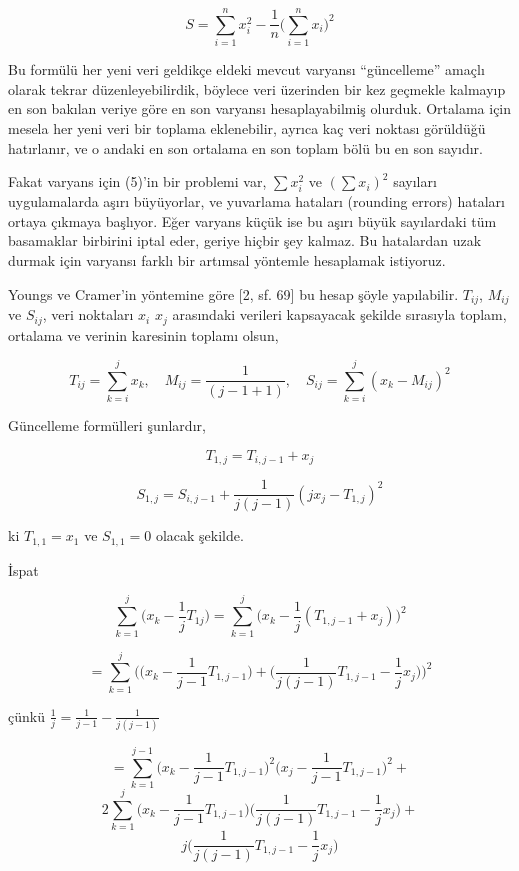 \documentclass[12pt,fleqn]{article}\usepackage{../../common}
\begin{document}
$$ 
S = \sum _{i=1}^{n} x_i^2 - \frac{1}{n} \bigg( \sum _{i=1}^{n} x_i \bigg)^2  
$$

Bu formülü her yeni veri geldikçe eldeki mevcut varyansı ``güncelleme''
amaçlı olarak tekrar düzenleyebilirdik, böylece veri üzerinden bir kez
geçmekle kalmayıp en son bakılan veriye göre en son varyansı
hesaplayabilmiş olurduk. Ortalama için mesela her yeni veri bir toplama
eklenebilir, ayrıca kaç veri noktası görüldüğü hatırlanır, ve o andaki en
son ortalama en son toplam bölü bu en son sayıdır. 

Fakat varyans için (5)'in bir problemi var, $\sum x_i^2$ ve $(\sum x_i)^2$
sayıları uygulamalarda aşırı büyüyorlar, ve yuvarlama hataları (rounding
errors) hataları ortaya çıkmaya başlıyor. Eğer varyans küçük ise bu aşırı
büyük sayılardaki tüm basamaklar birbirini iptal eder, geriye hiçbir şey
kalmaz. Bu hatalardan uzak durmak için varyansı farklı bir artımsal
yöntemle hesaplamak istiyoruz.

Youngs ve Cramer'in yöntemine göre [2, sf. 69] bu hesap şöyle
yapılabilir. $T_{ij}$, $M_{ij}$ ve $S_{ij}$, veri noktaları $x_i$ $x_j$
arasındaki verileri kapsayacak şekilde sırasıyla toplam, ortalama ve verinin
karesinin toplamı olsun,

$$ 
T_{ij} = \sum _{k=i}^{j} x_k , \quad  
M_{ij} = \frac{1}{(j-1+1)}, \quad
S_{ij} = \sum _{k=i}^{j} (x_k - M_{ij})^2
$$

Güncelleme formülleri şunlardır, 

$$ T_{1,j} = T_{i,j-1} + x_j$$

$$ S_{1,j} = S_{i,j-1} + \frac{1}{j(j-1)} (jx_j - T_{1,j})^2  $$

ki $T_{1,1} = x_1$ ve $S_{1,1}=0$ olacak şekilde.

İspat

$$ 
\sum _{k=1}^{j} \bigg( x_k - \frac{1}{j} T_{1j} \bigg) = 
\sum _{k=1}^{j} \bigg( x_k - \frac{1}{j} (T_{1,j-1}+x_j)  \bigg)^2
$$

$$ = \sum _{k=1}^{j} \bigg(
\bigg(x_k - \frac{1}{j-1}T_{1,j-1} \bigg) + 
\bigg( \frac{1}{j(j-1)} T_{1,j-1} - \frac{1}{j} x_j\bigg) 
\bigg)^2
$$

çünkü $\frac{1}{j} = \frac{1}{j-1}-\frac{1}{j(j-1)}$


$$
= \sum _{k=1}^{j-1} \bigg( x_k - \frac{1}{j-1} T_{1,j-1} \bigg)^2  
 \bigg( x_j - \frac{1}{j-1} T_{1,j-1} \bigg)^2 +
$$
$$
2 \sum _{k=1}^{j}  \bigg( x_k - \frac{1}{j-1} T_{1,j-1} \bigg)
\bigg( \frac{1}{j(j-1)} T_{1,j-1} - \frac{1}{j} x_j \bigg) +
$$
$$
j \bigg( \frac{1}{j(j-1)} T_{1,j-1} - \frac{1}{j} x_j \bigg) 
$$
\end{document}
